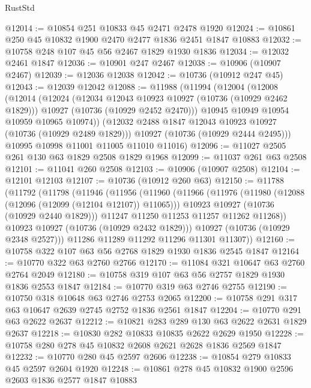 \begin{lexlean}{RustStd}
\begin{coremodule}
@12014 := @10854 @251 @10833 @45 @2471 @2478 @1920
@12024 := @10861 @250 @45 @10832 @1900 @2470 @2477 @1836 @2451 @1847 @10883
@12032 := @10758 @248 @107 @45 @56 @2467 @1829 @1930 @1836
@12034 := @12032 @2461 @1847
@12036 := @10901 @247 @2467
@12038 := @10906 (@10907 @2467)
@12039 := @12036 @12038
@12042 := @10736 (@10912 @247 @45)
@12043 := @12039 @12042
@12088 := @11988
    (@11994
      (@12004
        (@12008
          (@12014
            (@12024
              (@12034 @12043 @10923 @10927 (@10736 (@10929 @2462 @1829)))
              @10927
              (@10736 (@10929 @2452 @2470)))
            @10945
            @10949
            @10954
            @10959
            @10965
            @10974))
        (@12032 @2488 @1847 @12043 @10923 @10927 (@10736 (@10929 @2489 @1829)))
        @10927
        (@10736 (@10929 @2444 @2495)))
      @10995
      @10998
      @11001
      @11005
      @11010
      @11016)
@12096 := @11027 @2505 @261 @130 @63 @1829 @2508 @1829 @1968
@12099 := @11037 @261 @63 @2508
@12101 := @11041 @260 @2508
@12103 := @10906 (@10907 @2508)
@12104 := @12101 @12103
@12107 := @10736 (@10912 @260 @63)
@12150 := @11788
    (@11792
      (@11798
        (@11946
          (@11956
            (@11960
              (@11966
                (@11976
                  (@11980 (@12088 (@12096 (@12099 (@12104 @12107)) @11065)))
                  @10923
                  @10927
                  (@10736 (@10929 @2440 @1829)))
                @11247
                @11250
                @11253
                @11257
                @11262
                @11268))
            @10923
            @10927
            (@10736 (@10929 @2432 @1829)))
          @10927
          (@10736 (@10929 @2348 @2527)))
        @11286
        @11289
        @11292
        @11296
        @11301
        @11307))
@12160 := @10758 @322 @107 @63 @56 @2768 @1829 @1930 @1836 @2545 @1847
@12164 := @10770 @322 @63 @2760 @2766
@12170 := @11084 @321 @10647 @63 @2760 @2764 @2049
@12180 := @10758 @319 @107 @63 @56 @2757 @1829 @1930 @1836 @2553 @1847
@12184 := @10770 @319 @63 @2746 @2755
@12190 := @10750 @318 @10648 @63 @2746 @2753 @2065
@12200 := @10758 @291 @317 @63 @10647 @2639 @2745 @2752 @1836 @2561 @1847
@12204 := @10770 @291 @63 @2622 @2637
@12212 := @10821 @283 @289 @130 @63 @2622 @2631 @1829 @2637
@12218 := @10830 @282 @10833 @10835 @2622 @2629 @1950
@12228 := @10758 @280 @278 @45 @10832 @2608 @2621 @2628 @1836 @2569 @1847
@12232 := @10770 @280 @45 @2597 @2606
@12238 := @10854 @279 @10833 @45 @2597 @2604 @1920
@12248 := @10861 @278 @45 @10832 @1900 @2596 @2603 @1836 @2577 @1847 @10883

\end{coremodule}
\end{lexlean}
